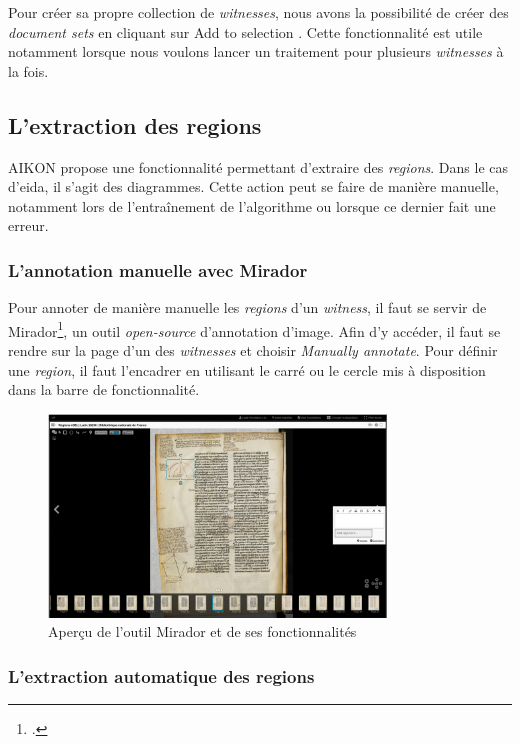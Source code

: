 Pour créer sa propre collection de \textit{witnesses}, nous avons la possibilité de créer des \textit{document sets} en cliquant sur \og Add to selection \fg. Cette fonctionnalité est utile notamment lorsque nous voulons lancer un traitement pour plusieurs \textit{witnesses} à la fois.

\subsection{L'extraction des regions}

AIKON propose une fonctionnalité permettant d'extraire des \textit{regions}. Dans le cas d'\gls{eida}, il s'agit des diagrammes. Cette action peut se faire de manière manuelle, notamment lors de l'entraînement de l'algorithme ou lorsque ce dernier fait une erreur. 

\subsubsection{L'annotation manuelle avec Mirador}

Pour annoter de manière manuelle les \textit{regions} d'un \textit{witness}, il faut se servir de Mirador\footcite{MiradorHome}, un outil \textit{open-source} d'annotation d'image. Afin d'y accéder, il faut se rendre sur la page d'un des \textit{witnesses} et choisir \og \textit{Manually annotate}\fg. Pour définir une \textit{region}, il faut l'encadrer en utilisant le carré ou le cercle mis à disposition dans la barre de fonctionnalité.

\begin{figure}[H]
	\centering
	\includegraphics[width=0.8\textwidth]{images/capture_ecran_mirador.png}
	\caption{Aperçu de l'outil Mirador et de ses fonctionnalités}
	\label{fig:apercu_mirador}
\end{figure}


\subsubsection{L'extraction automatique des regions}

